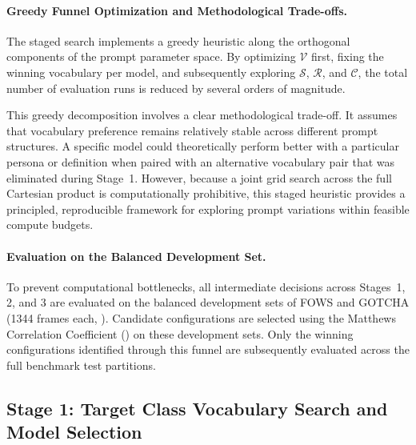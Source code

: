 \paragraph{Greedy Funnel Optimization and Methodological Trade-offs.}
The staged search implements a greedy heuristic along the orthogonal components of the prompt parameter space. By optimizing $\mathcal{V}$ first, fixing the winning vocabulary per model, and subsequently exploring $\mathcal{S}$, $\mathcal{R}$, and $\mathcal{C}$, the total number of evaluation runs is reduced by several orders of magnitude.

This greedy decomposition involves a clear methodological trade-off. It assumes that vocabulary preference remains relatively stable across different prompt structures. A specific model could theoretically perform better with a particular persona or definition when paired with an alternative vocabulary pair that was eliminated during Stage~1. However, because a joint grid search across the full Cartesian product is computationally prohibitive, this staged heuristic provides a principled, reproducible framework for exploring prompt variations within feasible compute budgets.

\paragraph{Evaluation on the Balanced Development Set.}
To prevent computational bottlenecks, all intermediate decisions across Stages~1, 2, and 3 are evaluated on the balanced development sets of FOWS and GOTCHA (\num{1344} frames each, ). Candidate configurations are selected using the Matthews Correlation Coefficient () on these development sets. Only the winning configurations identified through this funnel are subsequently evaluated across the full benchmark test partitions.

\subsection{Stage 1: Target Class Vocabulary Search and Model Selection}
\label{subsec:stage1_vocabulary}

